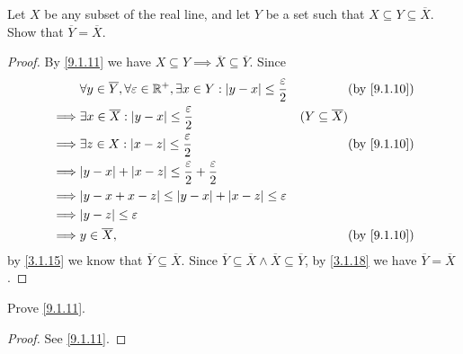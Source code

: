\exercisesection

\begin{ex}\label{ex:9.1.1}
	Let \(X\) be any subset of the real line, and let \(Y\) be a set such that \(X \subseteq Y \subseteq \overline{X}\).
	Show that \(\overline{Y} = \overline{X}\).
\end{ex}

\begin{proof}
	By \cref{9.1.11} we have \(X \subseteq Y \implies \overline{X} \subseteq \overline{Y}\).
	Since
	\begin{align*}
		         & \forall y \in \overline{Y}, \forall \varepsilon \in \R^+, \exists x \in Y : \abs{y - x} \leq \dfrac{\varepsilon}{2} &                            & \by{9.1.10} \\
		\implies & \exists x \in \overline{X} : \abs{y - x} \leq \dfrac{\varepsilon}{2}                                                & (Y \subseteq \overline{X})               \\
		\implies & \exists z \in X : \abs{x - z} \leq \dfrac{\varepsilon}{2}                                                           &                            & \by{9.1.10} \\
		\implies & \abs{y - x} + \abs{x - z} \leq \dfrac{\varepsilon}{2} + \dfrac{\varepsilon}{2}                                                                                 \\
		\implies & \abs{y - x + x - z} \leq \abs{y - x} + \abs{x - z} \leq \varepsilon                                                                                            \\
		\implies & \abs{y - z} \leq \varepsilon                                                                                                                                   \\
		\implies & y \in \overline{X},                                                                                                 &                            & \by{9.1.10}
	\end{align*}
	by \cref{3.1.15} we know that \(\overline{Y} \subseteq \overline{X}\).
	Since \(\overline{Y} \subseteq \overline{X} \land \overline{X} \subseteq \overline{Y}\), by \cref{3.1.18} we have \(\overline{Y} = \overline{X}\).
\end{proof}

\begin{ex}\label{ex:9.1.2}
	Prove \cref{9.1.11}.
\end{ex}

\begin{proof}
	See \cref{9.1.11}.
\end{proof}

